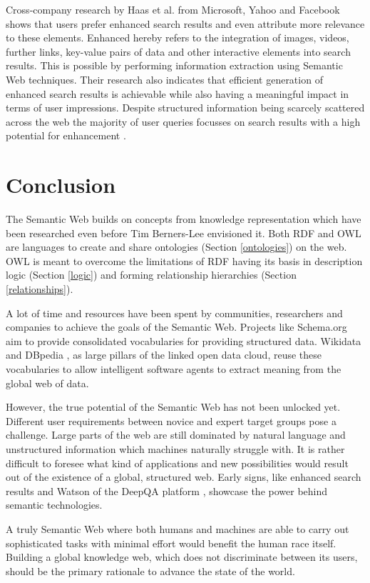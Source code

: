 Cross-company research by Haas et al. \cite{Haas2011b} from Microsoft, Yahoo and Facebook shows that users prefer enhanced search results and even attribute more relevance to these elements.
Enhanced hereby refers to the integration of images, videos, further links, key-value pairs of data and other interactive elements into search results.
This is possible by performing information extraction using Semantic Web techniques.
Their research also indicates that efficient generation of enhanced search results is achievable while also having a meaningful impact in terms of user impressions.
Despite structured information being scarcely scattered across the web the majority of user queries focusses on search results with a high potential for enhancement \cite{Haas2011b}.

\section{Conclusion}
The Semantic Web builds on concepts from knowledge representation which have been researched even before Tim Berners-Lee \cite{Berners-lee2002b} envisioned it.
Both RDF and OWL are languages to create and share ontologies (Section \ref{ontologies}) on the web.
OWL is meant to overcome the limitations of RDF having its basis in description logic (Section \ref{logic}) and forming relationship hierarchies (Section \ref{relationships}).

A lot of time and resources have been spent by communities, researchers and companies to achieve the goals of the Semantic Web.
Projects like Schema.org \cite{Guha2015b} aim to provide consolidated vocabularies for providing structured data.
Wikidata \cite{Vrandecic2014b} and DBpedia \cite{Bizer2009b}, as large pillars of the linked open data cloud, reuse these vocabularies to allow intelligent software agents to extract meaning from the global web of data.

However, the true potential of the Semantic Web has not been unlocked yet. 
Different user requirements between novice and expert target groups pose a challenge.
Large parts of the web are still dominated by natural language and unstructured information which machines naturally struggle with.
It is rather difficult to foresee what kind of applications and new possibilities would result out of the existence of a global, structured web. 
Early signs, like enhanced search results \cite{Haas2011b} and Watson of the DeepQA platform \cite{Ferrucci2010b}, showcase the power behind semantic technologies.

A truly Semantic Web where both humans and machines are able to carry out sophisticated tasks with minimal effort would benefit the human race itself.
Building a global knowledge web, which does not discriminate between its users, should be the primary rationale to advance the state of the world.
